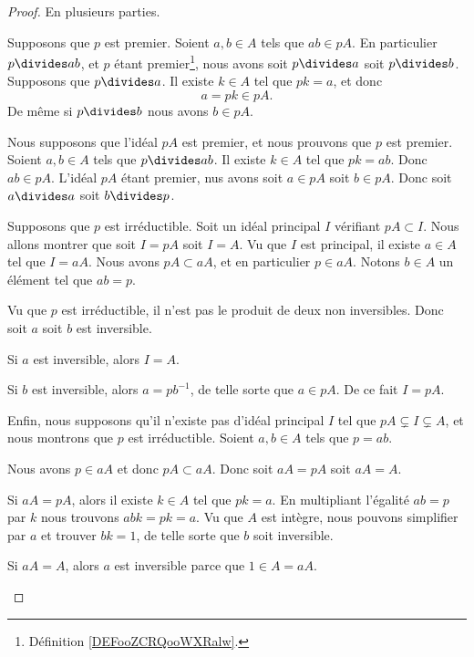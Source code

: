 \begin{proof}
	En plusieurs parties.
	\begin{subproof}
		\spitem[\ref{ITEMooJWRYooHndNpV}\( \Rightarrow\)]

		Supposons que \( p\) est premier. Soient \( a,b\in A\) tels que \( ab\in pA\). En particulier \( p\divides ab\), et \( p\) étant premier\footnote{Définition \ref{DEFooZCRQooWXRalw}.}, nous avons soit \( p\divides a\) soit \( p\divides b\). Supposons que \( p\divides a\). Il existe \( k\in A\) tel que \( pk=a\), et donc
		\begin{equation}
			a=pk\in pA.
		\end{equation}
		De même si \( p\divides b\) nous avons \( b\in pA\).

		\spitem[\ref{ITEMooJWRYooHndNpV}\( \Leftarrow\)]

		Nous supposons que l'idéal \( pA\) est premier, et nous prouvons que \( p\) est premier. Soient \( a,b\in A\) tels que \( p\divides ab\). Il existe \( k\in A\) tel que \( pk=ab\). Donc \( ab\in pA\). L'idéal \( pA\) étant premier, nus avons soit \( a\in pA\) soit \( b\in pA\). Donc soit \( a\divides a\) soit \( b\divides p\).

		\spitem[\ref{ITEMooGHGCooRkJilg}\( \Rightarrow\)]

		Supposons que \( p\) est irréductible. Soit un idéal principal \( I\) vérifiant \( pA\subset I\). Nous allons montrer que soit \( I=pA\) soit \( I=A\). Vu que \( I\) est principal, il existe \( a\in A\) tel que \( I=aA\). Nous avons \( pA\subset aA\), et en particulier \( p\in aA\). Notons \( b\in A\) un élément tel que \( ab=p\).

		Vu que \( p\) est irréductible, il n'est pas le produit de deux non inversibles. Donc soit \( a\) soit \( b\) est inversible.

		Si \( a\) est inversible, alors \( I=A\).

		Si \( b\) est inversible, alors \( a=pb^{-1}\), de telle sorte que \( a\in pA\). De ce fait \( I=pA\).

		\spitem[\ref{ITEMooGHGCooRkJilg}\( \Leftarrow\)]

		Enfin, nous supposons qu'il n'existe pas d'idéal principal \( I\) tel que \( pA\subsetneq I\subsetneq A\), et nous montrons que \( p\) est irréductible. Soient \( a,b\in A\) tels que \( p=ab\).

		Nous avons \( p\in aA\) et donc \( pA\subset aA\). Donc soit \( aA=pA\) soit \( aA=A \).

		Si \( aA=pA\), alors il existe \( k\in A\) tel que \( pk=a\). En multipliant l'égalité \( ab=p\) par \( k \) nous trouvons \( abk=pk=a\). Vu que \( A\) est intègre, nous pouvons simplifier par \( a\) et trouver \( bk=1\), de telle sorte que \( b\) soit inversible.


		Si \( aA=A\), alors \( a\) est inversible parce que \( 1\in A=aA\).
	\end{subproof}
\end{proof}


